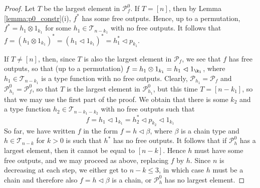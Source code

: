 \documentclass[12pt]{article}
\newtheorem{lemma}{Lemma}
\theoremstyle{definition}
\theoremstyle{remark}
\def\Te{\mathcal T}
\def\Pe{\mathcal P}
\def\vtl{\vartriangleleft}
\begin{document}
\begin{proof} Let $T$ be the largest element in $\Pe_f^0$. If $T=[n]$, then by Lemma
\ref{lemma:p0_constr}(i), $f^*$ has some free outputs. Hence, up to a permutation,
$f^*=h_1\otimes 1_{k_1}$ for some $h_1\in \Te_{n-k_1}$ with no free outputs. It follows that
$f=(h_1\otimes 1_{k_1})^*=(h_1\vtl 1_{k_1})^*=h_1^*\vtl p_{k_1}$. 

If $T\ne [n]$, then, since $T$
is also the largest element in $\Pe_f$, we see that $f$ has free outputs, so that (up to a
permutation)
$f=h_1\otimes 1_{k_1}=h_1\vtl 1_{\k_1}$, where $h_1\in \Te_{n-k_1}$ is a type function with no
free outputs. Clearly, $\Pe_{h_1}=\Pe_f$ and $\Pe_{h_1}^0=\Pe_f^0$, so that $T$ is the largest
element in $\Pe^0_{h_1}$, but this time $T=[n-k_1]$, so that we may use the first part of the
proof. We obtain that there is some $k_2$ and a type function  $h_2\in\Te_{n-k_1-k_2}$
with no free outputs such that 
\[
f=h_1\vtl 1_{k_1}=h_2^*\vtl p_{k_2}\vtl 1_{k_1}
\]
So far, we have written $f$ in the form $f=h\vtl \beta$, where $\beta$ is a chain type and
$h\in \Te_{n-k}$ for $k>0$ is such that $h^*$ has no free outputs. It follows that if
$\Pe_h^0$ has a largest element, then it cannot be equal to $[n-k]$. Hence $h$ must have
some free outputs, and we may proceed as above, replacing $f$ by $h$. Since $n$ is decreasing at each step, we
 either get to $n-k \le 3$, in which case $h$ must be a chain and therefore also $f=h\vtl
 \beta$ is a chain, or $\Pe^0_h$ has no largest element.


\end{proof}

%
%
%
%
%
%
\end{document}
